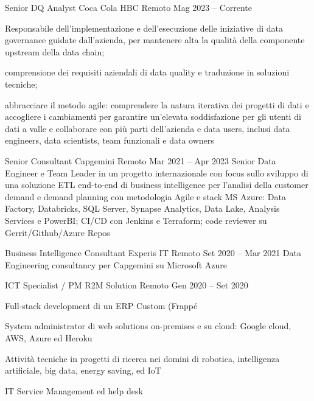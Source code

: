
  \begin{cventries}
    \cventry
    {Senior DQ Analyst}
    {Coca Cola HBC}    
    {Remoto}
    {Mag 2023 -- Corrente}
    {
      \begin{cvitems}
        \item {Responsabile dell'implementazione e dell'esecuzione delle iniziative di data governance guidate dall'azienda,
        per mantenere alta la qualità della componente upstream della data chain;}
        \item{comprensione dei requisiti aziendali di data quality e traduzione in soluzioni tecniche;}
        \item{abbracciare il metodo agile: comprendere la natura iterativa dei progetti di dati e accogliere i cambiamenti per garantire un'elevata soddisfazione per gli utenti di dati a valle e collaborare con più parti dell'azienda e data users, inclusi data engineers, data scientists, team funzionali e data owners}
      \end{cvitems}
    }

    \cventry
    {Senior Consultant}
    {Capgemini}    
    {Remoto}
    {Mar 2021 -- Apr 2023}
    {Senior Data Engineer e Team Leader in un progetto internazionale con focus sullo sviluppo di una soluzione ETL end-to-end di business intelligence per l'analisi della customer demand e demand planning con metodologia Agile e stack MS Azure: Data Factory, Databricks, SQL Server, Synapse Analytics, Data Lake, Analysis Services e PowerBI; CI/CD con Jenkins e Terraform; code reviewer su Gerrit/Github/Azure Repos}

    \cventry
    {Business Intelligence Consultant}
    {Experis IT}    
    {Remoto}
    {Set 2020 -- Mar 2021}
    {Data Engineering consultancy per Capgemini su Microsoft Azure}

    \cventry
    {ICT Specialist / PM}
    {R2M Solution}    
    {Remoto}
    {Gen 2020 -- Set 2020}
    {
      \begin{cvitems}
        \item {Full-stack development di un ERP Custom (Frappé}
        \item {System administrator di web solutions on-premises e su cloud: Google cloud, AWS, Azure ed Heroku}
        \item {Attività tecniche in progetti di ricerca nei domini di robotica, intelligenza artificiale, big data, energy saving, ed IoT}
        \item {IT Service Management ed help desk}
      \end{cvitems}
    }


\end{cventries}
